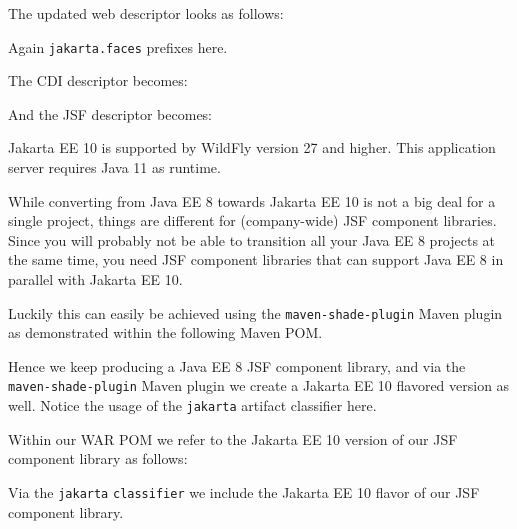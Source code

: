 The updated web descriptor looks as follows:

Again \texttt{jakarta.faces} prefixes here.

The CDI descriptor becomes:

And the JSF descriptor becomes:


Jakarta EE 10 is supported by WildFly version 27 and higher.
This application server requires Java 11 as runtime.

While converting from Java EE 8 towards Jakarta EE 10 is not a big deal for a single project, things are different for (company-wide) JSF component libraries.
Since you will probably not be able to transition all your Java EE 8 projects at the same time, you need JSF component libraries that can support Java EE 8 in parallel with Jakarta EE 10.

Luckily this can easily be achieved using the \texttt{maven-shade-plugin} Maven plugin as demonstrated within the following Maven POM.

Hence we keep producing a Java EE 8 JSF component library, and via the \texttt{maven-shade\allowbreak -plugin} Maven plugin we create a Jakarta EE 10 flavored version as well.
Notice the usage of the \texttt{jakarta} artifact classifier here.

Within our WAR POM we refer to the Jakarta EE 10 version of our JSF component library as follows:

Via the \texttt{jakarta} \texttt{classifier} we include the Jakarta EE 10 flavor of our JSF component library.
